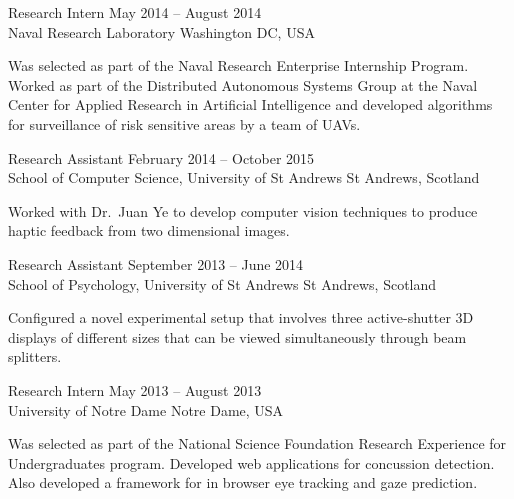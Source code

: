 \documentclass[line,margin]{cv}
\begin{document}
\begin{resume}
\begin{adjustwidth}{2.5em}{2.5em}
\end{adjustwidth}

Research Intern
\hfill May 2014 -- August 2014 \\
Naval Research Laboratory \hfill Washington DC, USA

\begin{adjustwidth}{2.5em}{2.5em}

    Was selected as part of the Naval Research Enterprise Internship Program.
    Worked as part of the Distributed Autonomous Systems Group at the Naval
    Center for Applied Research in Artificial Intelligence and developed
    algorithms for surveillance of risk sensitive areas by a team of UAVs.

\end{adjustwidth}

Research Assistant
\hfill February 2014 -- October 2015 \\
School of Computer Science, University of St Andrews \hfill St Andrews,
Scotland

\begin{adjustwidth}{2.5em}{2.5em}

    Worked with Dr.\ Juan Ye to develop computer vision techniques to produce
    haptic feedback from two dimensional images.

\end{adjustwidth}

Research Assistant
\hfill September 2013 -- June 2014 \\
School of Psychology, University of St Andrews \hfill St Andrews, Scotland

\begin{adjustwidth}{2.5em}{2.5em}

    Configured a novel experimental setup that involves three active-shutter 3D
    displays of different sizes that can be viewed simultaneously through beam
    splitters.

\end{adjustwidth}

Research Intern
\hfill May 2013 -- August 2013 \\
University of Notre Dame \hfill Notre Dame, USA

\begin{adjustwidth}{2.5em}{2.5em}

    Was selected as part of the National Science Foundation Research Experience
    for Undergraduates program. Developed web applications for concussion
    detection. Also developed a framework for in browser eye tracking and gaze
    prediction.


\end{adjustwidth}
\end{resume}
\end{document}
